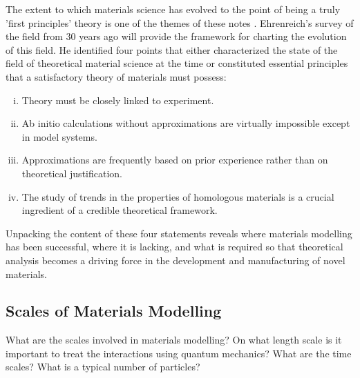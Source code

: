 The extent to which materials science has evolved to the point of being 
a truly 'first principles' theory is one of the themes of 
these notes \cite{finnis12, ismailbeigi2017}.
%
%
Ehrenreich's survey of the field from 30 years ago will provide the framework 
for charting the evolution of this field.
He identified four points that either characterized the state 
of the field of theoretical material science at the time or constituted essential principles 
that a satisfactory theory of materials must possess:
%
\begin{enumerate}[i)]
\label{en:ehrenreich}
\item Theory must be closely linked to experiment.
\item Ab initio calculations without approximations are virtually impossible 
      except in model systems.
\item Approximations are frequently based on prior experience rather 
      than on theoretical justification.
\item The study of trends in the properties of homologous materials 
      is a crucial ingredient of a credible theoretical framework.
\end{enumerate}
%
Unpacking the content of these four statements reveals where 
materials modelling has been successful, where it is lacking,
and what is required so that theoretical analysis becomes a driving
force in the development and manufacturing of novel materials.

\subsection{Scales of Materials Modelling}
What are the scales involved in materials modelling?
On what length scale is it important to treat the interactions
using quantum mechanics? What are the time scales? 
What is a typical number of particles?

